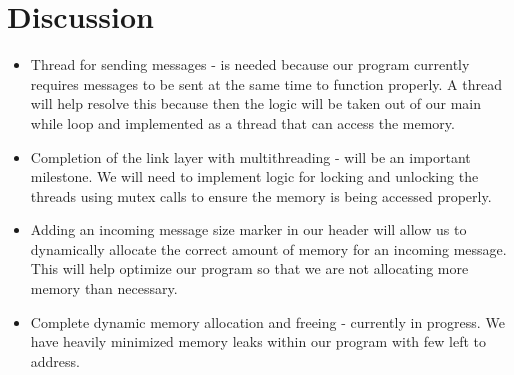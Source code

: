 \documentclass{article}
\begin{document}
\section*{Discussion}
\begin{itemize}
\item Thread for sending messages - is needed because our program currently requires messages to be sent at the same time to function properly. A thread will help resolve this because then the logic will be taken out of our main while loop and implemented as a thread that can access the memory.
\item Completion of the link layer with multithreading - will be an important milestone. We will need to implement logic for locking and unlocking the threads using mutex calls to ensure the memory is being accessed properly. 
\item Adding an incoming message size marker in our header will allow us to dynamically allocate the correct amount of memory for an incoming message. This will help optimize our program so that we are not allocating more memory than necessary.
\item Complete dynamic memory allocation and freeing - currently in progress. We have heavily minimized memory leaks within our program with few left to address.
\end{itemize}
\end{document}
